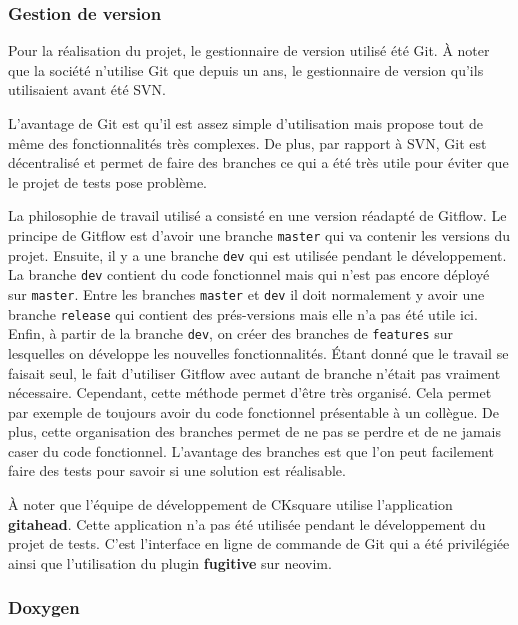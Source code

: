 \documentclass[a4paper]{article}
\begin{document}
\subsubsection{Gestion de version}

Pour la réalisation du projet, le gestionnaire de version utilisé été Git. À
noter que la société n'utilise Git que depuis un ans, le gestionnaire de version
qu'ils utilisaient avant été SVN.

L'avantage de Git est qu'il est assez simple d'utilisation mais propose tout de
même des fonctionnalités très complexes. De plus, par rapport à SVN, Git est
décentralisé et permet de faire des branches ce qui a été très utile pour éviter
que le projet de tests pose problème.

La philosophie de travail utilisé a consisté en une version réadapté de Gitflow.
Le principe de Gitflow est d'avoir une branche \lstinline{master} qui va
contenir les versions du projet. Ensuite, il y a une branche \lstinline{dev} qui
est utilisée pendant le développement. La branche \lstinline{dev} contient du
code fonctionnel mais qui n'est pas encore déployé sur \lstinline{master}. Entre
les branches \lstinline{master} et \lstinline{dev} il doit normalement y avoir
une branche \lstinline{release} qui contient des prés-versions mais elle n'a pas
été utile ici. Enfin, à partir de la branche \lstinline{dev}, on créer des
branches de \lstinline{features} sur lesquelles on développe les nouvelles
fonctionnalités. Étant donné que le travail se faisait seul, le fait d'utiliser
Gitflow avec autant de branche n'était pas vraiment nécessaire. Cependant, cette
méthode permet d'être très organisé. Cela permet par exemple de toujours avoir
du code fonctionnel présentable à un collègue. De plus, cette organisation des
branches permet de ne pas se perdre et de ne jamais caser du code fonctionnel.
L'avantage des branches est que l'on peut facilement faire des tests pour savoir
si une solution est réalisable.

À noter que l'équipe de développement de CKsquare utilise l'application
\textbf{gitahead}. Cette application n'a pas été utilisée pendant le
développement du projet de tests. C'est l'interface en ligne de commande de Git
qui a été privilégiée ainsi que l'utilisation du plugin \textbf{fugitive} sur
neovim.

\subsubsection{Doxygen}
\end{document}
